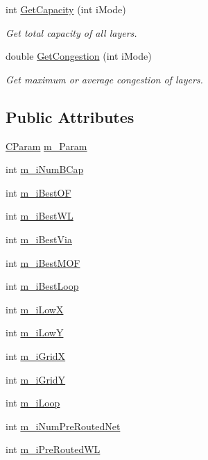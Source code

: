 \begin{DoxyCompactItemize}
int \mbox{\hyperlink{classCDesign_a5167e124564fd469dbcfbae344c1f6f9}{Get\+Capacity}} (int i\+Mode)
\begin{DoxyCompactList}\small\item\em Get total capacity of all layers. \end{DoxyCompactList}\item 
double \mbox{\hyperlink{classCDesign_a18f8be6fd29a69a897bc98c5e4b880b6}{Get\+Congestion}} (int i\+Mode)
\begin{DoxyCompactList}\small\item\em Get maximum or average congestion of layers. \end{DoxyCompactList}\end{DoxyCompactItemize}
\subsection*{Public Attributes}
\begin{DoxyCompactItemize}
\item 
\mbox{\hyperlink{classCParam}{C\+Param}} \mbox{\hyperlink{classCDesign_a489d3618699827b5e627a664f2f7d5f5}{m\+\_\+\+Param}}
\item 
int \mbox{\hyperlink{classCDesign_a74e65d9fd11c4a039befff9d8e41b01d}{m\+\_\+i\+Num\+B\+Cap}}
\item 
int \mbox{\hyperlink{classCDesign_ab1c2cde9f96bb133aa87519650e45bce}{m\+\_\+i\+Best\+OF}}
\item 
int \mbox{\hyperlink{classCDesign_aa2e160d691c0b14d8cc87082241bc72f}{m\+\_\+i\+Best\+WL}}
\item 
int \mbox{\hyperlink{classCDesign_a63f7490b8edc70d0fce2658acbbeb777}{m\+\_\+i\+Best\+Via}}
\item 
int \mbox{\hyperlink{classCDesign_a6bfd1ebd78092c33333828bf515a87fc}{m\+\_\+i\+Best\+M\+OF}}
\item 
int \mbox{\hyperlink{classCDesign_ab28a7a221cb19327d59269dfcf5483e9}{m\+\_\+i\+Best\+Loop}}
\item 
int \mbox{\hyperlink{classCDesign_a5bea929e13e38c200d2034651457a27e}{m\+\_\+i\+LowX}}
\item 
int \mbox{\hyperlink{classCDesign_ab15ef3272b9a059506bbd5adc0f7ef0c}{m\+\_\+i\+LowY}}
\item 
int \mbox{\hyperlink{classCDesign_a1f90694498252121b0cf678a5026004d}{m\+\_\+i\+GridX}}
\item 
int \mbox{\hyperlink{classCDesign_a30145716f1b1f9150985e1fda92d6241}{m\+\_\+i\+GridY}}
\item 
int \mbox{\hyperlink{classCDesign_a302a56631b844951a559379c91f4f131}{m\+\_\+i\+Loop}}
\item 
int \mbox{\hyperlink{classCDesign_a49b0509865376bfa3288521a01a765c1}{m\+\_\+i\+Num\+Pre\+Routed\+Net}}
\item 
int \mbox{\hyperlink{classCDesign_a0f8b3a9f0579f6dcefd066d4ee4e050d}{m\+\_\+i\+Pre\+Routed\+WL}}
\end{DoxyCompactItemize}
